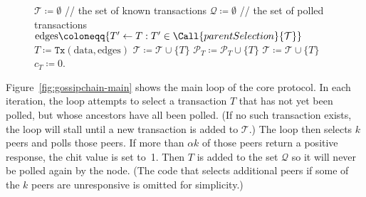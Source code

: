 \begin{figure}
\begin{center}
\begin{algorithmic}[1]
    \small
        \State $\mathcal{T} \coloneqq \emptyset$ \hspace{1ex}\textrm{// the set of known transactions}
        \State $\mathcal{Q} \coloneqq \emptyset$ \hspace{1ex}\textrm{// the set of polled transactions}
    \EndProcedure
        \State $\mathrm{edges} \coloneqq \{T' \gets T: T' \in \Call{parentSelection}{\mathcal{T}}\}$
        \State $T \coloneqq \texttt{Tx}(\mathrm{data}, \mathrm{edges})$
        \State $\mathcal{T} \coloneqq \mathcal{T} \cup \{T\}$
    \EndProcedure
            \State $\mathcal{P}_T \coloneqq \mathcal{P}_T \cup \{T\}$
            \State $\mathcal{T} \coloneqq \mathcal{T} \cup \{T\}$
            \State $c_T \coloneqq 0$.
        \EndIf
    \EndProcedure
    \label{fig:gossipchain-ongen}
\end{algorithmic}
\end{center}
\end{figure}


Figure~\ref{fig:gossipchain-main} shows the main loop of the core protocol.
In each iteration, the loop attempts to select a transaction $T$ that has not
yet been polled, but whose ancestors have all been polled.  (If no such
transaction exists, the loop will stall until a new transaction is
added to $\mathcal{T}$.)
The loop then selects $k$ peers and polls those peers.
If more than $\alpha k$ of those peers return a positive response,
the chit value is set to~1.  Then $T$ is added to the set $\mathcal{Q}$
so it will never be polled again by the node.
(The code that selects additional peers if some of the $k$ peers are
unresponsive is omitted for simplicity.)

